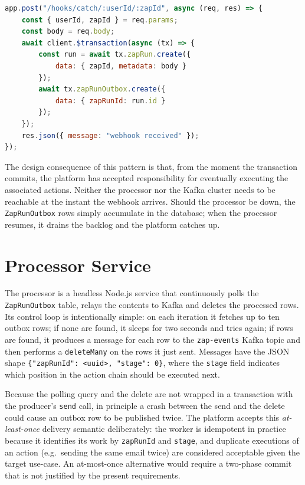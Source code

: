 \begin{lstlisting}[language=JavaScript, caption={Transactional outbox insert in the hook service.}, label=lst:hook]
app.post("/hooks/catch/:userId/:zapId", async (req, res) => {
    const { userId, zapId } = req.params;
    const body = req.body;
    await client.$transaction(async (tx) => {
        const run = await tx.zapRun.create({
            data: { zapId, metadata: body }
        });
        await tx.zapRunOutbox.create({
            data: { zapRunId: run.id }
        });
    });
    res.json({ message: "webhook received" });
});
\end{lstlisting}

The design consequence of this pattern is that, from the moment the transaction commits, the platform has accepted responsibility for eventually executing the associated actions. Neither the processor nor the Kafka cluster needs to be reachable at the instant the webhook arrives. Should the processor be down, the \texttt{ZapRunOutbox} rows simply accumulate in the database; when the processor resumes, it drains the backlog and the platform catches up.

\section{Processor Service}

The processor is a headless Node.js service that continuously polls the \texttt{ZapRunOutbox} table, relays the contents to Kafka and deletes the processed rows. Its control loop is intentionally simple: on each iteration it fetches up to ten outbox rows; if none are found, it sleeps for two seconds and tries again; if rows are found, it produces a message for each row to the \texttt{zap-events} Kafka topic and then performs a \texttt{deleteMany} on the rows it just sent. Messages have the JSON shape \texttt{\{"zapRunId": <uuid>, "stage": 0\}}, where the \texttt{stage} field indicates which position in the action chain should be executed next.

Because the polling query and the delete are not wrapped in a transaction with the producer's \texttt{send} call, in principle a crash between the send and the delete could cause an outbox row to be published twice. The platform accepts this \emph{at-least-once} delivery semantic deliberately: the worker is idempotent in practice because it identifies its work by \texttt{zapRunId} and \texttt{stage}, and duplicate executions of an action (e.g.\ sending the same email twice) are considered acceptable given the target use-case. An at-most-once alternative would require a two-phase commit that is not justified by the present requirements.

